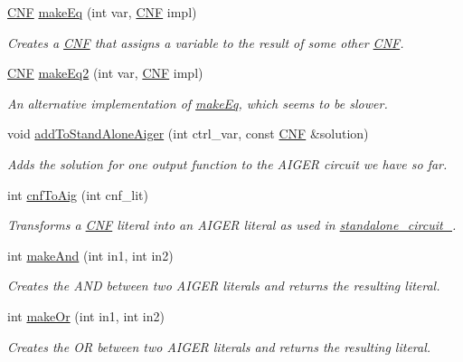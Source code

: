 \begin{DoxyCompactItemize}
\hyperlink{classCNF}{C\-N\-F} \hyperlink{classLearningImplExtractor_af747a4869a3ca8a8e77e39c435b94ce8}{make\-Eq} (int var, \hyperlink{classCNF}{C\-N\-F} impl)
\begin{DoxyCompactList}\small\item\em Creates a \hyperlink{classCNF}{C\-N\-F} that assigns a variable to the result of some other \hyperlink{classCNF}{C\-N\-F}. \end{DoxyCompactList}\item 
\hyperlink{classCNF}{C\-N\-F} \hyperlink{classLearningImplExtractor_ae491299fffa2b1dcb6ccce010b0fc5f7}{make\-Eq2} (int var, \hyperlink{classCNF}{C\-N\-F} impl)
\begin{DoxyCompactList}\small\item\em An alternative implementation of \hyperlink{classLearningImplExtractor_af747a4869a3ca8a8e77e39c435b94ce8}{make\-Eq}, which seems to be slower. \end{DoxyCompactList}\item 
void \hyperlink{classLearningImplExtractor_a70515dea9636bbcd9fe3e31bdf47e110}{add\-To\-Stand\-Alone\-Aiger} (int ctrl\-\_\-var, const \hyperlink{classCNF}{C\-N\-F} \&solution)
\begin{DoxyCompactList}\small\item\em Adds the solution for one output function to the A\-I\-G\-E\-R circuit we have so far. \end{DoxyCompactList}\item 
int \hyperlink{classLearningImplExtractor_a88143aa67de5be8848f643cfb2947834}{cnf\-To\-Aig} (int cnf\-\_\-lit)
\begin{DoxyCompactList}\small\item\em Transforms a \hyperlink{classCNF}{C\-N\-F} literal into an A\-I\-G\-E\-R literal as used in \hyperlink{classLearningImplExtractor_a17f7c47bf3e84fa5a70930e01a18deb2}{standalone\-\_\-circuit\-\_\-}. \end{DoxyCompactList}\item 
int \hyperlink{classLearningImplExtractor_a8f9d325813c0f792321a932f358cfe78}{make\-And} (int in1, int in2)
\begin{DoxyCompactList}\small\item\em Creates the A\-N\-D between two A\-I\-G\-E\-R literals and returns the resulting literal. \end{DoxyCompactList}\item 
int \hyperlink{classLearningImplExtractor_a25260410178b107783cbc10fdf69c52d}{make\-Or} (int in1, int in2)
\begin{DoxyCompactList}\small\item\em Creates the O\-R between two A\-I\-G\-E\-R literals and returns the resulting literal. \end{DoxyCompactList}\item 

\end{DoxyCompactItemize}
